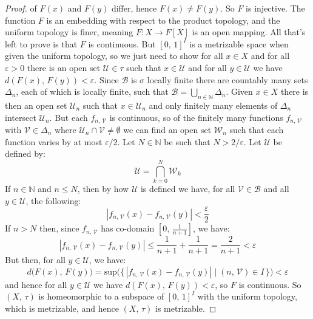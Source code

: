 \documentclass{article}
\theoremstyle{plain}
\theoremstyle{normal}
\begin{document}
\begin{proof}
            of $F(x)$ and $F(y)$ differ, hence $F(x)\ne{F}(y)$. So $F$ is
            injective. The function $F$ is an embedding with respect to the
            product topology, and the uniform topology is finer, meaning
            $F:X\rightarrow{F}[X]$ is an open mapping. All that's left to
            prove is that $F$ is continuous. But $[0,\,1]^{I}$ is a metrizable
            space when given the uniform topology, so we just need to show for
            all $x\in{X}$ and for all $\varepsilon>0$ there is an open set
            $\mathcal{U}\in\tau$ such that $x\in\mathcal{U}$ and for all
            $y\in\mathcal{U}$ we have $d(F(x),\,F(y))<\varepsilon$.
            Since $\mathcal{B}$ is $\sigma$ locally finite there are countably
            many sets $\Delta_{n}$, each of which is locally finite, such that
            $\mathcal{B}=\bigcup_{n\in\mathbb{N}}\Delta_{n}$. Given $x\in{X}$
            there is then an open set $\mathcal{U}_{n}$ such that
            $x\in\mathcal{U}_{n}$ and only finitely many elements of
            $\Delta_{n}$ intersect $\mathcal{U}_{n}$. But each
            $f_{n,\,\mathcal{V}}$ is continuous, so of the finitely many
            functions $f_{n,\,\mathcal{V}}$ with $\mathcal{V}\in\Delta_{n}$
            where $\mathcal{U}_{n}\cap\mathcal{V}\ne\emptyset$ we can find an
            open set $\mathcal{W}_{n}$ such that each function varies by at
            most $\varepsilon/2$. Let $N\in\mathbb{N}$ be such that
            $N>2/\varepsilon$. Let $\mathcal{U}$ be defined by:
            \begin{equation}
                \mathcal{U}=\bigcap_{k=0}^{N}\mathcal{W}_{k}
            \end{equation}
            If $n\in\mathbb{N}$ and $n\leq{N}$, then by how $\mathcal{U}$ is
            defined we have, for all $\mathcal{V}\in\mathcal{B}$ and all
            $y\in\mathcal{U}$, the following:
            \begin{equation}
                |f_{n,\,\mathcal{V}}(x)-f_{n,\,\mathcal{V}}(y)|
                <\frac{\varepsilon}{2}
            \end{equation}
            If $n>N$ then, since $f_{n,\,\mathcal{V}}$ has co-domain
            $[0,\,\frac{1}{n+1}]$, we have:
            \begin{equation}
                |f_{n,\,\mathcal{V}}(x)-f_{n,\,\mathcal{V}}(y)|
                \leq\frac{1}{n+1}+\frac{1}{n+1}=\frac{2}{n+1}<\varepsilon
            \end{equation}
            But then, for all $y\in\mathcal{U}$, we have:
            \begin{equation}
                d\big(F(x),\,F(y)\big)
                =\textrm{sup}\Big(\big\{\,
                    |f_{n,\,\mathcal{V}}(x)-f_{n,\,\mathcal{V}}(y)|\;\big|\;
                        (n,\,\mathcal{V})\in{I}\,\big\}\Big)
                <\varepsilon
            \end{equation}
            and hence for all $y\in\mathcal{U}$ we have
            $d(F(x),\,F(y))<\varepsilon$, so $F$ is continuous. So
            $(X,\,\tau)$ is homeomorphic to a subspace of $[0,\,1]^{I}$ with
            the uniform topology, which is metrizable, and hence
            $(X,\,\tau)$ is metrizable.
        \end{proof}
\end{document}
